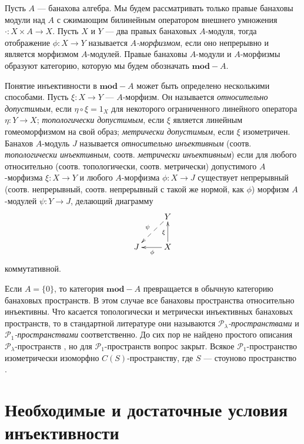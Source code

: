 \documentclass[12pt]{article}
\begin{document}
Пусть $A$ --- банахова алгебра. Мы будем рассматривать только правые банаховы модули над $A$ с сжимающим билинейным оператором внешнего умножения $\cdot:X\times A\to X$. Пусть $X$ и $Y$ --- два правых банаховых $A$-модуля, тогда отображение $\phi:X\to Y$ называется \textit{$A$-морфизмом}, если оно непрерывно и является морфизмом $A$-модулей. Правые банаховы $A$-модули и $A$-морфизмы образуют категорию, которую мы будем обозначать $\mathbf{mod}-A$.

Понятие инъективности в $\mathbf{mod}-A$ может быть определено несколькими способами. Пусть $\xi:X\to Y$ --- $A$-морфизм. Он называется \textit{относительно допустимым}, если $\eta\circ \xi=1_X$ для некоторого ограниченного линейного оператора $\eta:Y\to X$; \textit{топологически допустимым}, если $\xi$ является линейным гомеоморфизмом на свой образ; \textit{метрически допустимым}, если $\xi$ изометричен.
Банахов $A$-модуль $J$ называется \textit{относительно инъективным} (соотв. \textit{топологически инъективным}, соотв. \textit{метрически инъективным}) если для любого относительно (соотв. топологически, соотв. метрически) допустимого $A$-морфизма $\xi:X\to Y$ и любого $A$-морфизма $\phi:X\to J$ существует непрерывный (соотв. непрерывный, соотв. непрерывный с такой же нормой, как  $\phi$) морфизм $A$-модулей $\psi:Y\to J$, делающий диаграмму
$$
    \xymatrix{
    & {Y} \\
    {J} \ar@{<--}[ur]^{\psi} &{X} \ar[u]^{\xi} \ar[l]^{\phi}}
$$
коммутативной.

Если $A=\{0\}$, то категория $\mathbf{mod}-A$ превращается в обычную категорию банаховых пространств. В этом случае все банаховы пространства относительно инъективны. Что касается топологически и метрически инъективных банаховых пространств, то в стандартной литературе они называются \textit{$\mathcal{P}_\lambda$-пространствами} и \textit{$\mathcal{P}_1$-пространствами} соответственно. До сих пор не найдено простого описания $\mathcal{P}_\lambda$-пространств \cite[стр. vi]{AvilSepInjBanSp}, но для $\mathcal{P}_1$-пространств вопрос закрыт. Всякое $\mathcal{P}_1$-пространство изометрически изоморфно $C(S)$-пространству, где $S$ --- стоуново пространство \cite{HasumExtPropCompBanSp}.


\section{Необходимые и достаточные условия инъективности}
\label{SecionNecessaryAndSufficientConditionsForInjectivity}
\end{document}
